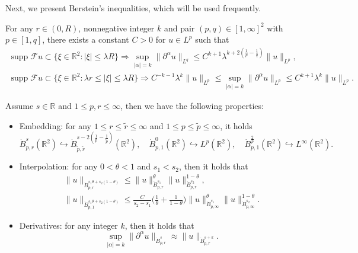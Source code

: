 \documentclass[reqno]{amsart}
\begin{document}
Next, we present Berstein's inequalities, which will be used frequently.

\begin{lemma} \label{lem2.1}
For any $r\in(0,R)$, nonnegative integer $k$ and pair $(p,q)\in[1,\infty]^2$ with
$p\in[1,q]$, there exists a constant $C>0$ for $u\in L^p$ such that
\begin{gather*}
 \operatorname{supp}\mathcal{F}u\subset \{\xi\in\mathbb{R}^2:
 |\xi|\leqslant\lambda R\}
 \Rightarrow\sup _{|\alpha|=k}\|\partial^\alpha u\|_{L^q}
 \leqslant C^{k+1}\lambda^{k+2(\frac{1}{p}-\frac{1}{q})}\|u\|_{L^p},\\
 \operatorname{supp}\mathcal{F}u\subset\{\xi\in\mathbb{R}^2:
 \lambda r\leqslant|\xi|\leqslant\lambda R\}\Rightarrow C^{-k-1}
 \lambda^k\|u\|_{L^p}\leqslant\sup _{|\alpha|=k}
 \|\partial^\alpha u\|_{L^p}\leqslant C^{k+1}\lambda^{k}\|u\|_{L^p}.
 \end{gather*}
\end{lemma}


\begin{lemma}\label{lem2.2}
Assume $s\in \mathbb{R}$ and $1\leqslant p,r\leqslant\infty$, then we have the
following properties:
 \begin{itemize}
\item[(1)] Embedding: for any $1\leqslant r \leqslant\tilde{r}\leqslant\infty$ and
$1\leqslant p \leqslant\tilde{p}\leqslant\infty$, it holds
\begin{equation} \label{2.1}
\dot{B}^s_{p,r}(\mathbb{R}^2)\hookrightarrow\dot{B}^{s-2(\frac{1}{p}
-\frac{1}{\tilde{p}})}_{\tilde{p},\tilde{r}}(\mathbb{R}^2),\quad
\dot{B}^0_{p,1}(\mathbb{R}^2)\hookrightarrow L^p(\mathbb{R}^2), \quad
\dot{B}^{\frac{2}{p}}_{p,1}(\mathbb{R}^2)\hookrightarrow L^\infty(\mathbb{R}^2).
\end{equation}

\item[(2)] Interpolation: for any $0<\theta<1$ and $s_1<s_2$, then it holds that
\begin{gather}
\|u\|_{\dot{B}^{ s_1\theta+s_2(1-\theta)}_{p,r}}
 \leqslant \|u\|_{\dot{B}^{s_1}_{p,r}}^\theta\|u\|_{\dot{B}^{s_2}_{p,r}}^{1-\theta}, \label{2.2}\\
\|u\|_{\dot{B}^{ s_1\theta+s_2(1-\theta)}_{p,1}}
 \leqslant\frac{C}{s_2-s_1}\Big(\frac{1}{\theta}+\frac{1}{1-\theta}\Big)
 \|u\|_{\dot{B}^{s_1}_{p,\infty}}^\theta\|u\|_{\dot{B}^{s_2}_{p,\infty}}^{1-\theta}.
 \label{2.3}
\end{gather}

\item[(3)] Derivatives: for any integer $k$, then it holds that
\begin{equation} \label{2.4}
 \sup _{|\alpha|=k}\|\partial^\alpha u\|_{\dot{B}^{s}_{p,r}}
 \approx\|u\|_{\dot{B}^{s+k}_{p,r}}.
\end{equation}
 \end{itemize}
\end{lemma}
\end{document}
